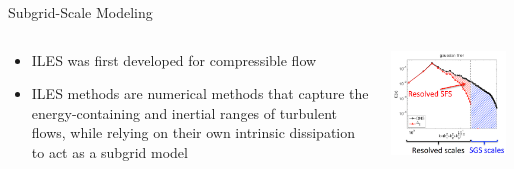\begin{frame}{Subgrid-Scale Modeling}

\begin{columns}[T]
    \begin{column}{.6\textwidth}
      \begin{minipage}[c][.6\textheight][c]{\linewidth}
      \begin{itemize}
      \item ILES was first developed for compressible flow
      \item ILES methods are numerical methods that capture the energy-containing and inertial ranges of turbulent flows, while relying on their own intrinsic dissipation to act as a subgrid model
      \end{itemize}
      \end{minipage}
    \end{column}
    \begin{column}{.6\textwidth}
    \includegraphics[width=0.95\textwidth]{decomp1}
    \end{column}
  \end{columns}
\end{frame}


